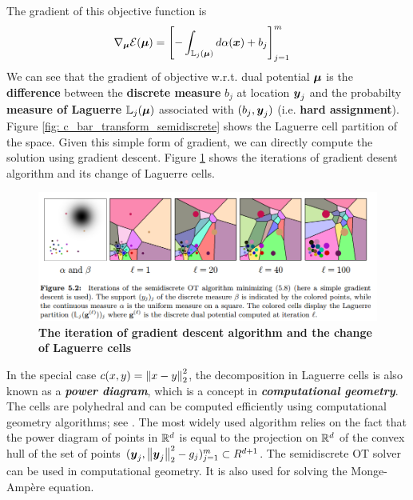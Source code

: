 \documentclass[11pt]{article}
\begin{document}
The gradient of this objective function is 
\begin{align}
\nabla_{\boldsymbol{\mu}}{{\mathcal E}(\boldsymbol{\mu})} &= \left[-\int_{{\mathbb L}_{j}(\boldsymbol{\mu}) }d\alpha(\boldsymbol{x})  + b_{j}\right]_{j=1}^{m}  \label{eqn: semidiscrete_grad}
\end{align} We can see that the gradient of objective w.r.t. dual potential $\boldsymbol{\mu}$ is the \textbf{difference} between the \textbf{discrete measure} $b_j$ at location $\boldsymbol{y}_j$ and the probabilty \textbf{measure of Laguerre} ${\mathbb L}_{j}(\boldsymbol{\mu})$ associated with $(b_j, \boldsymbol{y}_j)$ (i.e. \textbf{hard assignment}). Figure \ref{fig: c_bar_transform_semidiscrete} shows the Laguerre cell partition of the space. Given this simple form of gradient, we can directly compute the solution using gradient descent. Figure \ref{fig: semidiscrete_ot_iteration} shows the iterations of gradient desent algorithm and its change of Laguerre cells.

\begin{figure}
\begin{minipage}[t]{1\linewidth}
  \centering
  \centerline{\includegraphics[scale = 0.4]{semidiscrete_ot_iteration.png}}
\end{minipage}
\caption{\footnotesize{\textbf{The iteration of gradient descent algorithm and the change of Laguerre cells \citep{gabriel2019computational}}}}
\label{fig: semidiscrete_ot_iteration}
\end{figure}
In the special case $c(x, y) = \left\|x - y\right\|_{2}^2$, the decomposition in Laguerre cells is also known as a \textbf{\emph{power diagram}}, which is a concept in \emph{\textbf{computational geometry}}. The cells are polyhedral and can be computed efficiently using computational geometry algorithms; see \citep{aurenhammer1987power}. The most widely used algorithm relies on the fact that the power diagram of points in ${\mathbb R}^d$ is equal to the
projection on ${\mathbb R}^d$ of the convex hull of the set of points $(\boldsymbol{y}_j, \left\|\boldsymbol{y}_j\right\|_{2}^2 - g_j)_{j=1}^{m} \subset R^{d+1}$. The semidiscrete
OT solver can be used in computational geometry. It is also used for solving the Monge-Amp\`ere equation. 
\end{document}
